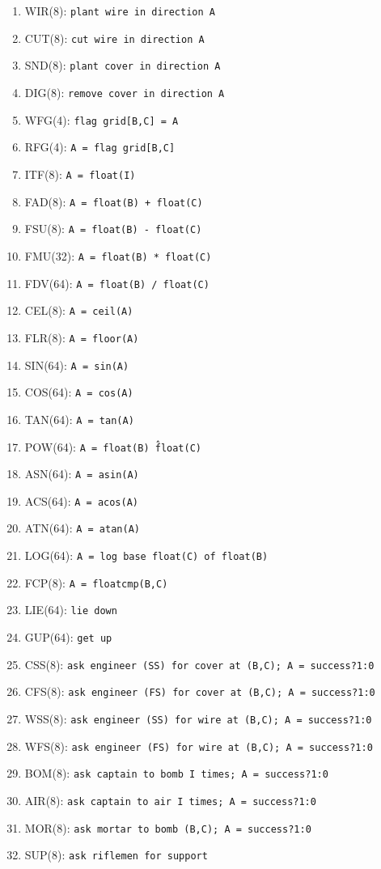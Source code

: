\documentclass{article}
\begin{document}
\begin{enumerate}[noitemsep]
    \item WIR(8): \texttt{plant wire in direction A}
    \item CUT(8): \texttt{cut wire in direction A}
    \item SND(8): \texttt{plant cover in direction A}
    \item DIG(8): \texttt{remove cover in direction A}
    \item WFG(4): \texttt{flag grid[B,C] = A}
    \item RFG(4): \texttt{A = flag grid[B,C]}
    \item ITF(8): \texttt{A = float(I)}
    \item FAD(8): \texttt{A = float(B) + float(C)}
    \item FSU(8): \texttt{A = float(B) - float(C)}
    \item FMU(32): \texttt{A = float(B) * float(C)}
    \item FDV(64): \texttt{A = float(B) / float(C)}
    \item CEL(8): \texttt{A = ceil(A)}
    \item FLR(8): \texttt{A = floor(A)}
    \item SIN(64): \texttt{A = sin(A)}
    \item COS(64): \texttt{A = cos(A)}
    \item TAN(64): \texttt{A = tan(A)}
    \item POW(64): \texttt{A = float(B) \^ float(C)}
    \item ASN(64): \texttt{A = asin(A)}
    \item ACS(64): \texttt{A = acos(A)}
    \item ATN(64): \texttt{A = atan(A)}
    \item LOG(64): \texttt{A = log base float(C) of float(B)}
    \item FCP(8): \texttt{A = floatcmp(B,C)}
    \item LIE(64): \texttt{lie down}
    \item GUP(64): \texttt{get up}
    \item CSS(8): \texttt{ask engineer (SS) for cover at (B,C); A = success?1:0}
    \item CFS(8): \texttt{ask engineer (FS) for cover at (B,C); A = success?1:0}
    \item WSS(8): \texttt{ask engineer (SS) for wire at (B,C); A = success?1:0}
    \item WFS(8): \texttt{ask engineer (FS) for wire at (B,C); A = success?1:0}
    \item BOM(8): \texttt{ask captain to bomb I times; A = success?1:0}
    \item AIR(8): \texttt{ask captain to air I times; A = success?1:0}
    \item MOR(8): \texttt{ask mortar to bomb (B,C); A = success?1:0}
    \item SUP(8): \texttt{ask riflemen for support}
\end{enumerate}
\end{document}
